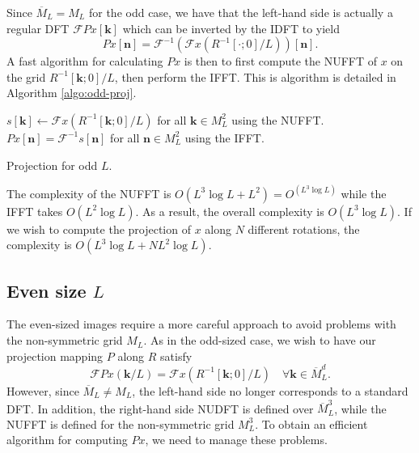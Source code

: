 \documentclass{article}
\newcommand{\Real}{\mathbb R}
\newcommand{\meshu}{M}
\newcommand{\meshc}{\overline{M}}
\newcommand{\vol}{x}
\newcommand{\proj}{P}
\newcommand{\vn}{\boldsymbol{n}}
\newcommand{\vk}{\boldsymbol{k}}
\newcommand{\rot}{R}
\newcommand{\fourier}[1]{\mathcal{F}#1}
\newcommand{\ifourier}[1]{\mathcal{F}^{-1}#1}
\begin{document}
Since $\meshc_L = \meshu_L$ for the odd case, we have that the left-hand side is actually a regular DFT $\fourier{\proj \vol}[\vk]$ which can be inverted by the IDFT to yield
\begin{equation}
    \proj \vol[\vn] = \ifourier{(\fourier{\vol}(\rot^{-1} [\cdot; 0]/L))}[\vn]\mbox{.}
\end{equation}
A fast algorithm for calculating $\proj \vol$ is then to first compute the NUFFT of $\vol$ on the grid $\rot^{-1} [\vk; 0]/L$, then perform the IFFT.
This is algorithm is detailed in Algorithm \ref{algo:odd-proj}.

\begin{algorithm}[t]
\begin{algorithmic}
\Function{ProjectOdd}{$\rot$, $\vol: \meshc_L^3 \rightarrow \Real$}
\State $s[\vk] \gets \fourier{\vol}(\rot^{-1} [\vk; 0]/L)$ for all $\vk \in \meshu_L^2$ using the NUFFT.
\State $\proj\vol[\vn] = \ifourier{s}[\vn]$ for all $\vn \in \meshu_L^2$ using the IFFT.
\EndFunction
\end{algorithmic}
\caption{
\label{algo:odd-proj}
Projection for odd $L$.
}
\end{algorithm}

The complexity of the NUFFT is $O(L^3 \log L + L^2) = O^(L^3 \log L)$ while the IFFT takes $O(L^2 \log L)$.
As a result, the overall complexity is $O(L^3 \log L)$.
If we wish to compute the projection of $\vol$ along $N$ different rotations, the complexity is $O(L^3 \log L + N L^2 \log L)$.

\subsection{Even size $L$}

The even-sized images require a more careful approach to avoid problems with the non-symmetric grid $\meshu_L$.
As in the odd-sized case, we wish to have our projection mapping $\proj$ along $\rot$ satisfy
\begin{equation}
	\fourier{\proj \vol}(\vk/L) = \fourier{\vol}(\rot^{-1} [\vk; 0]/L) \quad \forall \vk \in \meshc_L^d\mbox{.}
\end{equation}
However, since $\meshc_L \neq \meshu_L$, the left-hand side no longer corresponds to a standard DFT.
In addition, the right-hand side NUDFT is defined over $\meshc_L^3$, while the NUFFT is defined for the non-symmetric grid $\meshu_L^3$.
To obtain an efficient algorithm for computing $\proj\vol$, we need to manage these problems.
\end{document}
